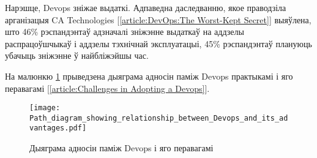 Нарэшце, Devops зніжае выдаткі. Адпаведна даследванню,
якое праводзіла арганізацыя CA Technologies%
[\ref{article:DevOps:The Worst-Kept Secret}]
выяўлена, што 46\% рэспандэнтаў адзначалі зніжэнне выдаткаў
на аддзелы распрацоўшчыкаў і аддзелы тэхнічнай эксплуатацыі,
45\% рэспандэнтаў плануюць убачыць зніжэнне ў найбліжэйшы час.

На малюнкю 
\ref{figure:Path diagram showing relationships between Devops and its benefits}
прыведзена дыяграма адносін паміж Devops практыкамі і яго перавагамі%
[\ref{article:Challenges in Adopting a Devops}].

\newpage
\begin{figure}[ht!]
    \texttt{[image: Path\_diagram\_showing\_relationship\_between\_Devops\_and\_its\_advantages.pdf]}
    \caption{Дыяграма адносін паміж Devops і яго перавагамі}
    \label{figure:Path diagram showing relationships between Devops and its benefits}
\end{figure}
%
%
%
%
%
%
%
